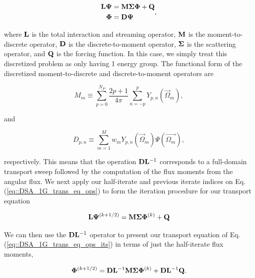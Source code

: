 \begin{equation}
\label{eq::DSA_1G_trans_eq_ops}
\begin{aligned}
{\bf L} {\bf \Psi} &= {\bf M} {\bf \Sigma} {\bf \Phi}  +    {\bf Q} \\
{\bf \Phi} &=  {\bf D} {\bf \Psi}
\end{aligned},
\end{equation}

\noindent where ${\bf L}$ is the total interaction and streaming operator, ${\bf M}$ is the moment-to-discrete operator, ${\bf D}$ is the discrete-to-moment operator, ${\bf \Sigma}$ is the scattering operator, and ${\bf Q}$ is the forcing function. In this case, we simply treat this discretized problem as only having 1 energy group. The functional form of the discretized moment-to-discrete and discrete-to-moment operators are

\begin{equation}
\label{eq::DSA_1G_M}
M_m \equiv \sum_{p=0}^{N_P} \frac{2p + 1}{4 \pi}   \sum_{n=-p}^{p}  Y_{p,n} (  \vec{\Omega}_m )   ,
\end{equation}

\noindent and 

\begin{equation}
\label{eq::DSA_1G_D}
D_{p,n} \equiv \sum_{m=1}^M w_m Y_{p,n} (\vec{\Omega}_m)  \Psi(\vec{\Omega_m}) ,
\end{equation}

\noindent respectively. This means that the operation ${\bf D} {\bf L}^{-1}$ corresponds to a full-domain transport sweep followed by the computation of the flux moments from the angular flux. We next apply our half-iterate and previous iterate indices on Eq. (\ref{eq::DSA_1G_trans_eq_ops}) to form the iteration procedure for our transport equation

\begin{equation}
\label{eq::DSA_1G_trans_eq_ops_its}
{\bf L} {\bf \Psi}^{(k+1/2)}= {\bf M} {\bf \Sigma} {\bf \Phi}^{(k)}  +    {\bf Q} 
\end{equation}

\noindent We can then use the ${\bf D} {\bf L}^{-1}$ operator to present our transport equation of Eq. (\ref{eq::DSA_1G_trans_eq_ops_its}) in terms of just the half-iterate flux moments,

\begin{equation}
\label{eq::DSA_1G_trans_eq_ops_mom}
 {\bf \Phi}^{(k+1/2)}  =  {\bf D} {\bf L}^{-1} {\bf M} {\bf \Sigma}  {\bf \Phi}^{(k)} +  {\bf D} {\bf L}^{-1}   {\bf Q} .
\end{equation}

